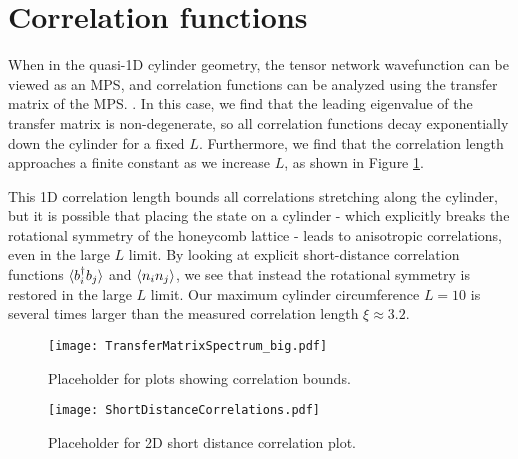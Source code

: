 
\section{Correlation functions}

When in the quasi-1D cylinder geometry, the tensor network 
wavefunction can be viewed as an MPS, and correlation functions can be 
analyzed using the transfer matrix of the MPS. . In this case, we find that the leading eigenvalue of the 
transfer matrix is non-degenerate, so all correlation functions decay 
exponentially down the cylinder for a fixed $L$. Furthermore, we find 
that the correlation length approaches a finite constant as we 
increase $L$, as shown in Figure \ref{fig:TMS}.

This 1D correlation length bounds all correlations stretching along 
the cylinder, but it is possible that placing the state on a cylinder 
- which explicitly breaks the rotational symmetry of the honeycomb 
lattice - leads to anisotropic correlations, even in the large $L$ 
limit. By looking at explicit short-distance correlation functions 
$\langle b_i^{\dagger} b_j \rangle$ and $\langle n_i n_j \rangle$, we see that instead the 
rotational symmetry is restored in the large $L$ limit. Our maximum 
cylinder circumference $L=10$ is several times larger than the 
measured correlation length $\xi \approx 3.2$.

\begin{figure}[hbtc]
	\centering
	\texttt{[image: TransferMatrixSpectrum\_big.pdf]}
	\caption{Placeholder for plots showing correlation bounds.}
	\label{fig:TMS}
\end{figure}

\begin{figure}[hbtc]
	\centering
	\texttt{[image: ShortDistanceCorrelations.pdf]}
	\caption{Placeholder for 2D short distance correlation plot.}
	\label{fig:ShortCorr}
\end{figure}


